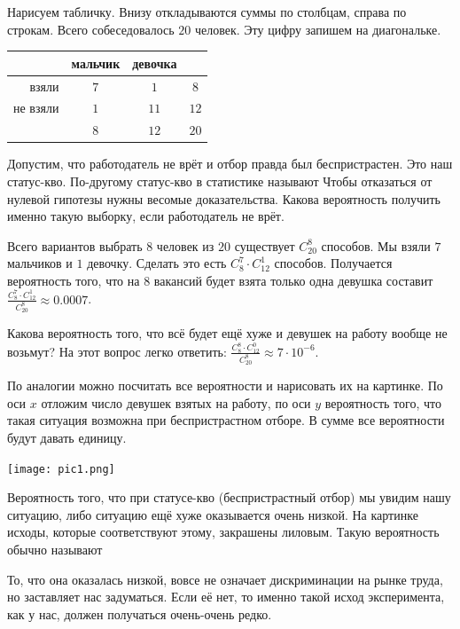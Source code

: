 \documentclass[12pt, a4paper, oneside]{article}
\begin{document}
Нарисуем табличку. Внизу откладываются суммы по столбцам, справа по строкам. Всего собеседовалось $20$ человек. Эту цифру запишем на диагональке. 

\begin{center}
    \begin{tabular}{|r|c|c|c|}
    \hline
                  & мальчик & девочка &        \\ \hline 
         взяли    &   $7$   &   $1$   & $8$    \\ \hline 
         не взяли &   $1$   &   $11$  & $12$   \\ \hline 
                  &   $8$   &   $12$  & $20$   \\ \hline
    \end{tabular}
\end{center}

Допустим, что работодатель не врёт и отбор правда был беспристрастен. Это наш статус-кво. По-другому статус-кво в статистике называют  Чтобы отказаться от нулевой гипотезы нужны весомые доказательства. Какова вероятность получить именно такую выборку, если работодатель не врёт.

Всего вариантов выбрать $8$ человек из $20$ существует $C_{20}^8$ способов. Мы взяли $7$ мальчиков и $1$ девочку. Сделать это есть $C_8^7 \cdot C_{12}^1$ способов. Получается вероятность того, что на $8$ вакансий будет взята только одна девушка составит $\frac{C_8^7 \cdot C_{12}^1}{C_{20}^8} \approx 0.0007$. 

Какова вероятность того, что всё будет ещё хуже и девушек на работу вообще не возьмут? На этот вопрос легко ответить: $\frac{C_8^8 \cdot C_{12}^0}{C_{20}^8} \approx 7 \cdot 10^{-6}$. 

По аналогии можно посчитать все вероятности и нарисовать их на картинке. По оси $x$ отложим число девушек взятых на работу, по оси $y$ вероятность того, что такая ситуация возможна при беспристрастном отборе. В сумме все вероятности будут давать единицу. 

\begin{center} 
\texttt{[image: pic1.png]}
\end{center} 

Вероятность того, что при статусе-кво (беспристрастный отбор) мы увидим нашу ситуацию, либо ситуацию ещё хуже оказывается очень низкой. На картинке исходы, которые соответствуют этому, закрашены лиловым. Такую вероятность обычно называют  

То, что она оказалась низкой, вовсе не означает дискриминации на рынке труда, но заставляет нас задуматься. Если её нет, то именно такой исход эксперимента, как у нас, должен получаться очень-очень редко. 
\end{document}
